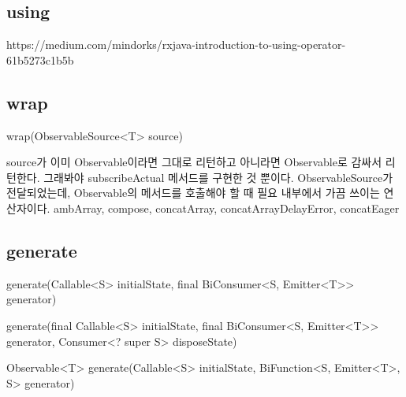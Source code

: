 \documentclass{book}
\begin{document}
\subsection{using}
https://medium.com/mindorks/rxjava-introduction-to-using-operator-61b5273c1b5b

\subsection{wrap}
wrap(ObservableSource<T> source)

source가 이미 Observable이라면 그대로 리턴하고 아니라면 Observable로 감싸서 리턴한다.
그래봐야 subscribeActual 메서드를 구현한 것 뿐이다.
ObservableSource가 전달되었는데, Observable의 메서드를 호출해야 할 때 필요
내부에서 가끔 쓰이는 연산자이다.
ambArray, compose, concatArray, concatArrayDelayError, concatEager

\subsection{generate}
generate(Callable<S> initialState, final BiConsumer<S, Emitter<T>> generator)

generate(final Callable<S> initialState,
            final BiConsumer<S, Emitter<T>> generator,
            Consumer<? super S> disposeState)

Observable<T> generate(Callable<S> initialState, BiFunction<S, Emitter<T>, S> generator)
\end{document}
